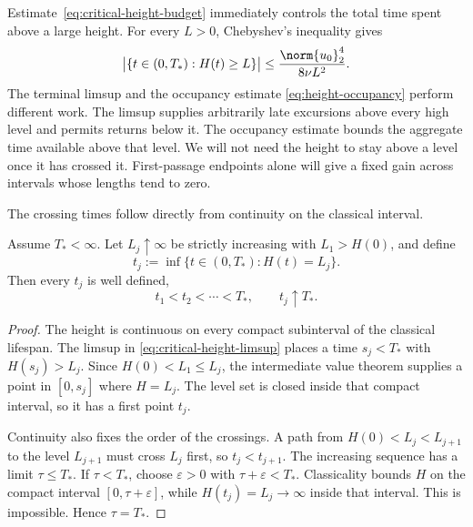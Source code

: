 Estimate~\eqref{eq:critical-height-budget} immediately controls the total time
spent above a large height.  For every \(L>0\), Chebyshev's inequality gives
\begin{equation}
 \bigl|\{t\in(0,T_*):H(t)\ge L\}\bigr|
 \le
 \frac{\norm{u_0}_2^4}{8\nu L^2}.
 \label{eq:height-occupancy}
\end{equation}
The terminal limsup and the occupancy estimate
\eqref{eq:height-occupancy} perform different work.  The
limsup supplies arbitrarily late excursions above every high level and permits
returns below it.  The occupancy estimate bounds the aggregate time available
above that level.  We will not need the height to stay above a level once it
has crossed it.  First-passage endpoints alone will give a fixed gain across
intervals whose lengths tend to zero.

The crossing times follow directly from continuity on the classical interval.

\begin{lemma}
\label{lem:first-passage-compression}
Assume \(T_*<\infty\).  Let \(L_j\uparrow\infty\) be strictly increasing with
\(L_1>H(0)\), and define
\begin{equation*}
 t_j:=\inf\{t\in(0,T_*):H(t)=L_j\}.
\end{equation*}
Then every \(t_j\) is well defined,
\begin{equation*}
 t_1<t_2<\cdots<T_*,
 \qquad
 t_j\uparrow T_*.
\end{equation*}
\end{lemma}

\begin{proof}
The height is continuous on every compact subinterval of the classical
lifespan.  The limsup in \eqref{eq:critical-height-limsup} places a time
\(s_j<T_*\) with \(H(s_j)>L_j\).  Since \(H(0)<L_1\le L_j\), the intermediate
value theorem supplies a point in \([0,s_j]\) where \(H=L_j\).  The level set
is closed inside that compact interval, so it has a first point \(t_j\).

Continuity also fixes the order of the crossings.  A path from
\(H(0)<L_j<L_{j+1}\) to the level \(L_{j+1}\) must cross \(L_j\) first, so
\(t_j<t_{j+1}\).  The increasing sequence has a limit \(\tau\le T_*\).  If
\(\tau<T_*\), choose \(\varepsilon>0\) with
\(\tau+\varepsilon<T_*\).  Classicality bounds \(H\) on the compact interval
\([0,\tau+\varepsilon]\), while
\(H(t_j)=L_j\to\infty\) inside that interval.  This is impossible.  Hence
\(\tau=T_*\).
\end{proof}

